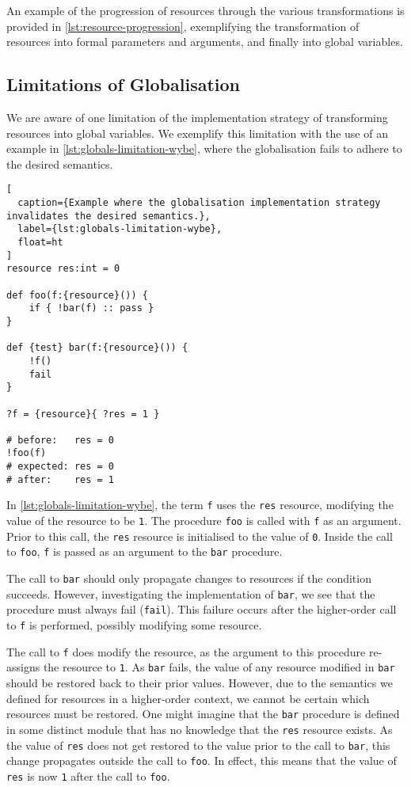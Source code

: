 An example of the progression of resources through the various transformations is provided in \cref{lst:resource-progression}, exemplifying the transformation of resources into formal parameters and arguments, and finally into global variables. 

\subsection{Limitations of Globalisation}
\label{ssec:globalisation-limitations}

We are aware of one limitation of the implementation strategy of transforming resources into global variables. We exemplify this limitation with the use of an example in \cref{lst:globals-limitation-wybe}, where the globalisation fails to adhere to the desired semantics. 

\begin{lstlisting}[
  caption={Example where the globalisation implementation strategy invalidates the desired semantics.},
  label={lst:globals-limitation-wybe},
  float=ht
]
resource res:int = 0

def foo(f:{resource}()) {
    if { !bar(f) :: pass }
}

def {test} bar(f:{resource}()) {
    !f()
    fail
}

?f = {resource}{ ?res = 1 }

# before:   res = 0
!foo(f)
# expected: res = 0
# after:    res = 1
\end{lstlisting}

In \cref{lst:globals-limitation-wybe}, the term \texttt{f} uses the \texttt{res} resource, modifying the value of the resource to be \texttt{1}. The procedure \texttt{foo} is called with \texttt{f} as an argument. Prior to this call, the \texttt{res} resource is initialised to the value of \texttt{0}. Inside the call to \texttt{foo}, \texttt{f} is passed as an argument to the \texttt{bar} procedure. 

The call to \texttt{bar} should only propagate changes to resources if the condition succeeds. However, investigating the implementation of \texttt{bar}, we see that the procedure must always fail (\texttt{fail}). This failure occurs after the higher-order call to \texttt{f} is performed, possibly modifying some resource.

The call to \texttt{f} does modify the resource, as the argument to this procedure re-assigns the resource to \texttt{1}. As \texttt{bar} fails, the value of any resource modified in \texttt{bar} should be restored back to their prior values. However, due to the semantics we defined for resources in a higher-order context, we cannot be certain which resources must be restored. One might imagine that the \texttt{bar} procedure is defined in some distinct module that has no knowledge that the \texttt{res} resource exists. As the value of \texttt{res} does not get restored to the value prior to the call to \texttt{bar}, this change propagates outside the call to \texttt{foo}. In effect, this means that the value of \texttt{res} is now \texttt{1} after the call to \texttt{foo}.

